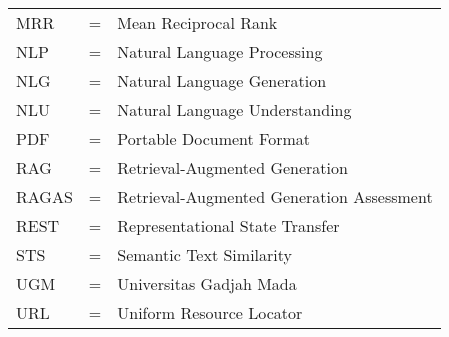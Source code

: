 \begin{tabular}{llp{3in}}
	MRR     & \hspace{1.5cm} = & Mean Reciprocal Rank                                         \\
	NLP     & \hspace{1.5cm} = & Natural Language Processing                                  \\
	NLG     & \hspace{1.5cm} = & Natural Language Generation                                  \\
	NLU     & \hspace{1.5cm} = & Natural Language Understanding                               \\
	PDF     & \hspace{1.5cm} = & Portable Document Format                                     \\
	RAG     & \hspace{1.5cm} = & Retrieval-Augmented Generation                               \\
	RAGAS   & \hspace{1.5cm} = & Retrieval-Augmented Generation Assessment                    \\
	REST    & \hspace{1.5cm} = & Representational State Transfer                              \\
	STS     & \hspace{1.5cm} = & Semantic Text Similarity                                     \\
	UGM     & \hspace{1.5cm} = & Universitas Gadjah Mada                                      \\
	URL     & \hspace{1.5cm} = & Uniform Resource Locator                                     \\
\end{tabular}
